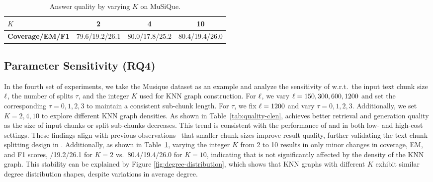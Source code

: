 \begin{table}[t]
\centering
\renewcommand{\arraystretch}{1.1}
\begin{small}
\caption{Answer quality by varying $K$ on MuSiQue.}
\label{tab:quality-k}
\begin{tabular}{lccc}	
    \toprule
    \bf $K$ & \bf 2 & \bf 4 & \bf 10\\
    \midrule
    \bf Coverage/EM/F1 & 79.6/19.2/26.1 & 80.0/17.8/25.2 & 80.4/19.4/26.0\\
    \bottomrule
\end{tabular}
\end{small}
\end{table}



\subsection{Parameter Sensitivity (RQ4)}

In the fourth set of experiments, we take the Musique dataset as an example and analyze the sensitivity of \sketragp w.r.t.\ the input text chunk size $\ell$, the number of splits $\tau$, and the integer $K$ used for KNN graph construction.
For $\ell$, we vary $\ell = 150, 300, 600, 1200$ and set the corresponding $\tau = 0, 1, 2, 3$ to maintain a consistent sub-chunk length. For $\tau$, we fix $\ell = 1200$ and vary $\tau = 0, 1, 2, 3$. Additionally, we set $K = 2, 4, 10$ to explore different KNN graph densities.
As shown in Table~\ref{tab:quality-clen}, \sketragp achieves better retrieval and generation quality as the size of input chunks or split sub-chunks decreases. This trend is consistent with the performance of \keyrag and \graphrag in both low- and high-cost settings. These findings align with previous observations~\cite{edge2024local} that smaller chunk sizes improve result quality, further validating the text chunk splitting design in \sketrag. 
Additionally, as shown in Table~\ref{tab:quality-k}, varying the integer $K$ from 2 to 10 results in only minor changes in coverage, EM, and F1 scores, /19.2/26.1 for $K = 2$ vs.\ 80.4/19.4/26.0 for $K = 10$, indicating that \sketrag is not significantly affected by the density of the KNN graph. This stability can be explained by Figure \ref{fig:degree-distribution}, which shows that KNN graphs with different $K$ exhibit similar degree distribution shapes, despite variations in average degree.